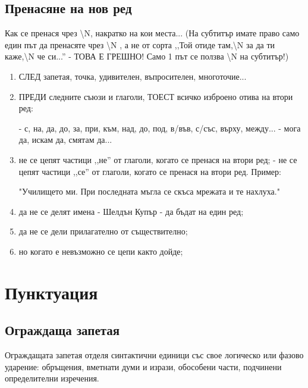 \subsection{Пренасяне на нов ред}
Как се пренася чрез \textbackslash N, накратко на кои места... (На субтитър имате право само един път да пренасяте чрез \textbackslash N , а не от сорта ,,Той отиде там,\textbackslash N за да ти каже,\textbackslash N че си...'' - ТОВА Е ГРЕШНО! Само 1 път се ползва \textbackslash N на субтитър!)

\begin{enumerate}
    \item СЛЕД запетая, точка, удивителен, въпросителен, многоточие...
    \item ПРЕДИ следните съюзи и глаголи, ТОЕСТ всичко изброено отива на втори ред:

    - с, на, да, до, за, при, към, над, до, под, в/във, с/със, върху, между...
    - мога да, искам да, смятам да...

    \item не се цепят частици ,,не'' от глаголи, когато се пренася на втори ред;
    - не се цепят частици ,,се'' от глаголи, когато се пренася на втори ред. 
    Пример: 
    
    "Училището ми. При последната мъгла
    се скъса мрежата и те нахлуха."
    
    \item да не се делят имена - Шелдън Купър - да бъдат на един ред;
    \item да не се дели прилагателно от съществително;
    \item но когато е невъзможно се цепи както дойде;

\end{enumerate}

\section{Пунктуация}
\subsection{Ограждаща запетая}
Ограждащата запетая отделя синтактични единици със свое логическо или фазово ударение: обръщения, вметнати думи и изрази, обособени части, подчинени определителни изречения.

